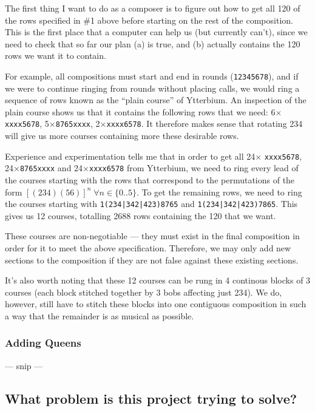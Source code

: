 \documentclass[12pt]{article}
\newcommand{\row}[1]{\texttt{#1}}
\begin{document}
The first thing I want to do as a composer is to figure out how to get all 120 of the rows specified
in \#1 above before starting on the rest of the composition.  This is the first place that a computer
can help us (but currently can't), since we need to check that so far our plan (a) is true, and (b)
actually contains the 120 rows we want it to contain.

For example, all compositions must start and end in rounds (\row{12345678}), and if we were to
continue ringing from rounds without placing calls, we would ring a sequence of rows known as the
``plain course'' of Ytterbium.  An inspection of the plain course shows us that it contains the
following rows that we need: 6$\times$\row{xxxx5678}, 5$\times$\row{8765xxxx},
2$\times$\row{xxxx6578}.  It therefore makes sense that rotating 234 will give us more courses
containing more these desirable rows.

Experience and experimentation tells me that in order to get all 24$\times$ \row{xxxx5678},
24$\times$\row{8765xxxx} and 24$\times$\row{xxxx6578} from Ytterbium, we need to ring every lead of
the courses starting with the rows that correspond to the permutations of the form
${[(234)(56)]}^n \; \forall n \in \{0..5\}$.  To get the remaining rows, we need to ring the
courses starting with \row{1(234|342|423)8765} and \row{1(234|342|423)7865}.  This gives us 12
courses, totalling 2688 rows containing the 120 that we want.

These courses are non-negotiable --- they must exist in the final composition in order for it to
meet the above specification.  Therefore, we may only add new sections to the composition if they
are not false against these existing sections.

It's also worth noting that these 12 courses can be rung in 4 continous blocks of 3 courses (each
block stitched together by 3 bobs affecting just 234).  We do, however, still have to stitch these
blocks into one contiguous composition in such a way that the remainder is as musical as possible.

\subsubsection{Adding Queens}

--- snip ---



\pagebreak

\fi



\subsection{What problem is this project trying to solve?}
\end{document}
